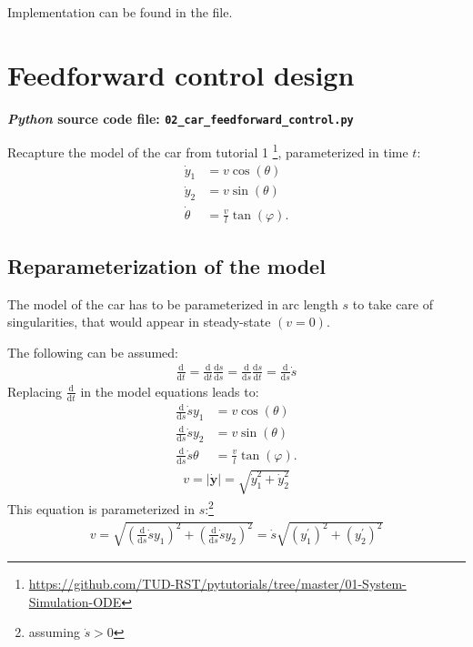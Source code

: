 \documentclass[a4paper,11pt,headings=standardclasses,parskip=half]{scrartcl}
\renewcommand{\d}{\mathrm{d}} %
\newcommand{\py}{\emph{Python}\xspace}
\begin{document}
Implementation can be found in the file.
\newpage
\section{Feedforward control design}
\label{sec:ffcontrol}
\textbf{\py source code file: \texttt{02\_car\_feedforward\_control.py}}

Recapture the model of the car from tutorial 1 \footnote{\url{https://github.com/TUD-RST/pytutorials/tree/master/01-System-Simulation-ODE}}, parameterized in time $t$:
\begin{subequations}
\begin{align}
\dot y_1 &= v \cos(\theta)\\
\dot y_2 &= v \sin(\theta)\\
\dot \theta &= \frac{v}{l}\tan(\varphi).
\end{align}
\end{subequations}
\subsection{Reparameterization of the model}
The model of the car has to be parameterized in arc length $s$ to take care of singularities, that would appear in steady-state $(v=0)$.

The following can be assumed:
\begin{align*}
\frac{\d}{\d t} = \frac{\d}{\d t}\frac{\d s}{\d s} = \frac{\d}{\d s}\frac{\d s}{\d t} = \frac{\d}{\d s}\dot s
\end{align*}
Replacing $\frac{\d}{\d t}$ in the model equations leads to:
\begin{subequations}
\begin{align}
\frac{\d}{\d s}\dot s y_1 &= v \cos(\theta)\\
\frac{\d}{\d s}\dot s y_2 &= v \sin(\theta)\\
\frac{\d}{\d s}\dot s \theta &= \frac{v}{l}\tan(\varphi).
\end{align}
\end{subequations}
\begin{align}
v = |\dot{\bm{y}}| = \sqrt{\dot y_1^2+\dot y_2^2}
\end{align}
This equation is parameterized in $s$:\footnote{assuming $\dot s > 0$} 
\begin{align}
v = \sqrt{(\frac{\d}{\d s}\dot sy_1)^2+(\frac{\d}{\d s}\dot s y_2)^2}=\dot s \sqrt{(y_1^\prime)^2+(y_2^\prime)^2}
\end{align}
 
\end{document}
